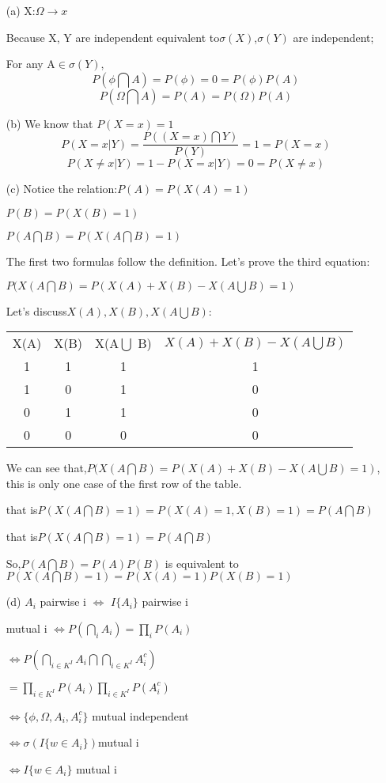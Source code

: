 \begin{enumerate}
    \item[(a)]X:$\Omega\rightarrow x$

Because X, Y are independent equivalent to$\sigma(X)$,$\sigma(Y)$ are independent;

For any A$\in \sigma(Y)$,
$$P(\phi \bigcap A)=P(\phi)=0=P(\phi)P(A)$$
$$P(\Omega \bigcap A)=P(A)=P(\Omega)P(A)$$

\item[(b)]We know that $P(X=x)=1$
$$P(X=x|Y)=\frac{P((X=x)\bigcap Y)}{P(Y)}=1=P(X=x)$$
$$P(X\neq x|Y)=1-P(X=x|Y)=0=P(X\neq x)$$

\item[(c)]Notice the relation:$P(A)=P(X(A)=1)$

$P(B)=P(X(B)=1)$

$P(A\bigcap B)=P(X(A\bigcap B)=1)$

The first two formulas follow the definition. Let's prove the third equation:

$P(X(A\bigcap B)=P(X(A)+X(B)-X(A\bigcup B) = 1)$

Let's discuss$X(A),X(B),X(A\bigcup B)$:

\begin{tabular}{|c|c|c|c|}
  \hline
  X(A) & X(B) & X(A$\bigcup$ B) & $X(A)+X(B)-X(A\bigcup B)$ \\
  1 & 1 & 1 & 1 \\
  1 & 0 & 1 & 0 \\
  0 & 1 & 1 & 0 \\
  0 & 0 & 0 & 0 \\
  \hline
\end{tabular}

We can see that,$P(X(A\bigcap B)=P(X(A)+X(B)-X(A\bigcup B) = 1)$, this is only one case of the first row of the table.

that is$P(X(A\bigcap B)=1)=P(X(A)=1,X(B)=1)=P(A\bigcap B)$

that is$P(X(A\bigcap B)=1)=P(A\bigcap B)$

So,$P(A\bigcap B)=P(A)P(B)$ is equivalent to $P(X(A\bigcap B)=1)=P(X(A)=1)P(X(B)=1)$

\item[(d)]$A_i$  pairwise i $\Leftrightarrow$ $I\{ A_i \}$  pairwise i

mutual i $\Leftrightarrow P(\bigcap_i A_i) = \prod_i P(A_i)$

$\Leftrightarrow P(\bigcap_{i\in K^I}A_i \bigcap \bigcap_{i\in K^I}A_i^c)$

$=\prod_{i\in K^I} P(A_i)\prod_{i\in K^I} P(A_i^c)$

$\Leftrightarrow \{\phi,\Omega,A_i,A_i^c\}$ mutual independent

$\Leftrightarrow  \sigma(I\{ w\in A_i\})$mutual i

$\Leftrightarrow I\{ w\in A_i\}$ mutual i

\end{enumerate}

